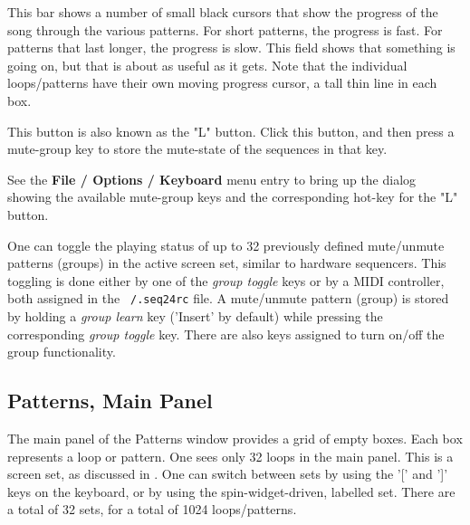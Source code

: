    \setcounter{ItemCounter}{0}      %

   This bar shows a number of small black cursors that show the progress of
   the song through the various patterns.  For short patterns, the progress
   is fast.  For patterns that last longer, the progress is slow.
   This field shows that something is going on, but that is about as useful
   as it gets.  Note that the individual loops/patterns have their own
   moving progress cursor, a tall thin line in each box.

   This button is also known as the "L" button.
   Click this button, and then press a mute-group key
   to store the mute-state of the sequences in that key.

   See the \textbf{File / Options / Keyboard} menu entry to bring up the
   dialog showing the available mute-group keys and the corresponding
   hot-key for the "L" button.

	One can toggle the playing status of up to 32 previously 
	defined mute/unmute patterns (groups) in the active screen 
	set, similar to hardware sequencers. 
	This toggling is done either by one of the \textsl{group toggle} keys 
	or by a MIDI controller, both assigned in the
   \texttt{~/.seq24rc} file. 
	A mute/unmute pattern (group) is stored by holding a 
   \textsl{group learn} key ('Insert' by default) while pressing the
   corresponding \textsl{group toggle} key. 
	There are also keys assigned to turn on/off the group 
	functionality.

\subsection{Patterns, Main Panel}
\label{subsec:seq24_patterns_panel_main}

   The main panel of the Patterns window provides a grid of empty boxes.
   Each box represents a loop or pattern.
   One sees only 32 loops in the main panel.
   This is a screen set, as discussed in
   .
   One can switch between sets
   by using the
   \index{keys![}
   '[' and
   \index{keys!]}
   ']' keys on the keyboard, or by using
   the spin-widget-driven, labelled set.  
   There are a total of 32 sets, for a total of 
   1024 loops/patterns. 

